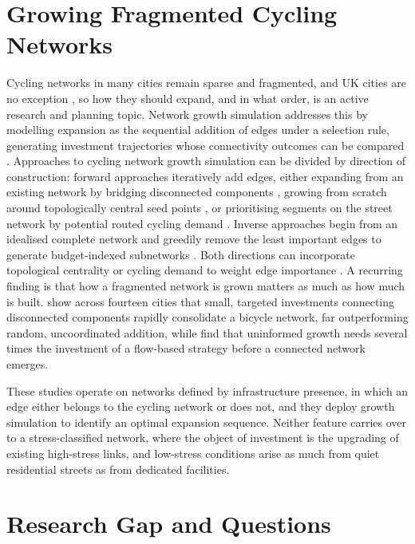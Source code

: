 \section{Growing Fragmented Cycling Networks}
\label{sec:lit-networkgrowth}

Cycling networks in many cities remain sparse and fragmented, and UK cities are no exception \parencite{schoner2014,szell2022,reggiani2023,tait2022}, so how they should expand, and in what order, is an active research and planning topic. Network growth simulation addresses this by modelling expansion as the sequential addition of edges under a selection rule, generating investment trajectories whose connectivity outcomes can be compared \parencite{barthelemy2009,xie2009,szell2022}. Approaches to cycling network growth simulation can be divided by direction of construction: forward approaches iteratively add edges, either expanding from an existing network by bridging disconnected components \parencite{nateraorozco2020}, growing from scratch around topologically central seed points \parencite{szell2022}, or prioritising segments on the street network by potential routed cycling demand \parencite{mahfouz2023}. Inverse approaches begin from an idealised complete network and greedily remove the least important edges to generate budget-indexed subnetworks \parencite{steinacker2022}. Both directions can incorporate topological centrality \parencite{szell2022} or cycling demand to weight edge importance \parencite{steinacker2022,mahfouz2023}. A recurring finding is that how a fragmented network is grown matters as much as how much is built. \textcite{nateraorozco2020} show across fourteen cities that small, targeted investments connecting disconnected components rapidly consolidate a bicycle network, far outperforming random, uncoordinated addition, while \textcite{szell2022} find that uninformed growth needs several times the investment of a flow-based strategy before a connected network emerges. 

These studies operate on networks defined by infrastructure presence, in which an edge either belongs to the cycling network or does not, and they deploy growth simulation to identify an optimal expansion sequence. Neither feature carries over to a stress-classified network, where the object of investment is the upgrading of existing high-stress links, and low-stress conditions arise as much from quiet residential streets as from dedicated facilities.  

\section{Research Gap and Questions}
\label{sec:lit-gaprq}

